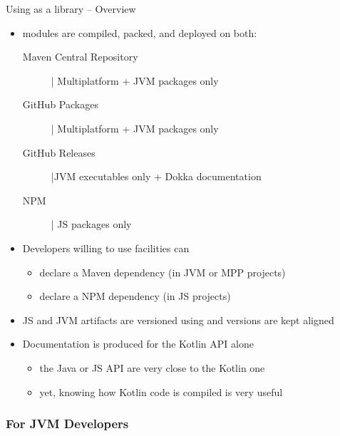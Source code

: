 \documentclass[handout]{beamer}
\begin{document}
\begin{frame}{Using \twopkt{} as a library -- Overview}
    
    \begin{itemize}
        \item \twopkt{} modules are compiled, packed, and deployed on both:
        \begin{description}
            \item[Maven Central Repository] | Multiplatform + JVM packages only
            \item[GitHub Packages] | Multiplatform + JVM packages only
            \item[GitHub Releases] |JVM executables only + Dokka documentation 
            \item[NPM] | JS packages only
        \end{description}

        \vfill

        \item Developers willing to use \twopkt{} facilities can
        \begin{itemize}
            \item declare a Maven dependency (in JVM or MPP projects)
            \item declare a NPM dependency (in JS projects)
        \end{itemize}

        \vfill

        \item JS and JVM artifacts are versioned using \alert{} and versions are kept aligned

        \vfill

        \item Documentation is produced for the Kotlin API alone
        \begin{itemize}
            \item the Java or JS API are very close to the Kotlin one
            \item yet, knowing how Kotlin code is compiled is very useful
        \end{itemize}
        
    \end{itemize}

\end{frame}

\subsubsection{For JVM Developers}
\end{document}
